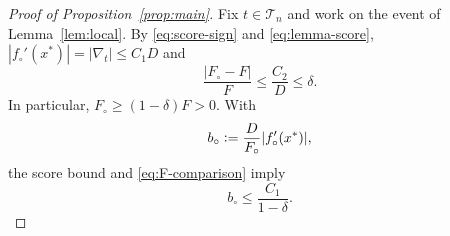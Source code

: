 \documentclass[11pt]{article}
\newcommand{\eqdef}{\mathrel{\vcentcolon=}}
\newcommand{\IF}{F}
\newcommand{\IFP}{F_{\circ}}
\newcommand{\DFN}{D}
\newcommand{\fp}{f_{\circ}}
\newcommand{\xs}{x^{*}}
\theoremstyle{definition}
\begin{document}
\begin{proof}[Proof of Proposition~\ref{prop:main}]
Fix \(t\in\mathcal T_n\) and work on the event of Lemma~\ref{lem:local}.
By \eqref{eq:score-sign} and \eqref{eq:lemma-score},
\(|\fp'(\xs)|=|\nabla_t|\leq C_1\DFN\) and
\begin{equation}
  \frac{|\IFP-\IF|}{\IF}
  \leq\frac{C_2}{\DFN}
  \leq\delta.
  \label{eq:F-comparison}
\end{equation}
In particular, \(\IFP\geq(1-\delta)\IF>0\).  With
\begin{equation}
  b_{\circ}\eqdef
  \frac{\DFN}{\IFP}|\fp'(\xs)|,
  \label{eq:bcirc}
\end{equation}
the score bound and \eqref{eq:F-comparison} imply
\begin{equation}
  b_{\circ}\leq\frac{C_1}{1-\delta}.
  \label{eq:bcirc-bound}
\end{equation}


\end{proof}
\end{document}
